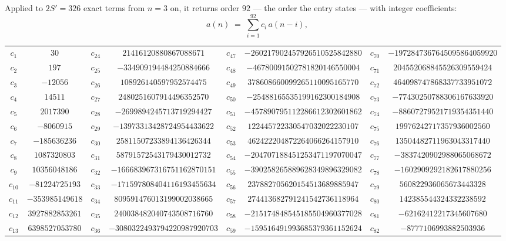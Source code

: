 \documentclass[11pt,a4paper]{article}
\theoremstyle{plain}
\theoremstyle{definition}
\begin{document}
Applied to $2S'=326$ exact terms from $n=3$ on, it returns order $92$ --- the
order the entry states --- with integer coefficients:
\[
a(n)\;=\;\sum_{i=1}^{92}c_i\,a(n-i),
\]
\begin{center}\small
\begin{tabular}{cccccccc}
$c_{1}$ & $30$ & $c_{24}$ & $21416120880867088671$ & $c_{47}$ & $-260217902457926510525842880$ & $c_{70}$ & $-1972847367645095864059920$ \\
$c_{2}$ & $197$ & $c_{25}$ & $-334909194484250884666$ & $c_{48}$ & $-46780091502781820146550004$ & $c_{71}$ & $204552068845526309559424$ \\
$c_{3}$ & $-12056$ & $c_{26}$ & $108926140597952574475$ & $c_{49}$ & $378608660099265110095165770$ & $c_{72}$ & $464098747868337733951072$ \\
$c_{4}$ & $14511$ & $c_{27}$ & $2480251607914496352570$ & $c_{50}$ & $-25488165535199162300184908$ & $c_{73}$ & $-77430250788306167633920$ \\
$c_{5}$ & $2017390$ & $c_{28}$ & $-2699894245713719294427$ & $c_{51}$ & $-457890795112286612302601862$ & $c_{74}$ & $-88607279521719354351440$ \\
$c_{6}$ & $-8060915$ & $c_{29}$ & $-13973313428724954433622$ & $c_{52}$ & $122445722330547032022230107$ & $c_{75}$ & $19976242717357936002560$ \\
$c_{7}$ & $-185636236$ & $c_{30}$ & $25811507233894136426344$ & $c_{53}$ & $462422204872264066264157910$ & $c_{76}$ & $13504482711963043317440$ \\
$c_{8}$ & $1087320803$ & $c_{31}$ & $58791572543179430012732$ & $c_{54}$ & $-204707188451253471197070047$ & $c_{77}$ & $-3837420902988065068672$ \\
$c_{9}$ & $10356048186$ & $c_{32}$ & $-166683967316751162870151$ & $c_{55}$ & $-390258265889628349896329082$ & $c_{78}$ & $-1602909292182617880256$ \\
$c_{10}$ & $-81224725193$ & $c_{33}$ & $-171597808404116193455634$ & $c_{56}$ & $237882705620154513689885947$ & $c_{79}$ & $560822936065673443328$ \\
$c_{11}$ & $-353985149618$ & $c_{34}$ & $809591476013199002038665$ & $c_{57}$ & $274413682791241542736118964$ & $c_{80}$ & $142385544324332238592$ \\
$c_{12}$ & $3927882853261$ & $c_{35}$ & $240038482040743508716760$ & $c_{58}$ & $-215174848545185504960377028$ & $c_{81}$ & $-62162412217345607680$ \\
$c_{13}$ & $6398527053780$ & $c_{36}$ & $-3080322493794220987920703$ & $c_{59}$ & $-159516491993685379361152624$ & $c_{82}$ & $-8777106993882503936$ \\

\end{tabular}
\end{center}
\end{document}
